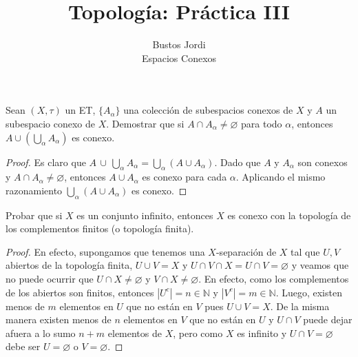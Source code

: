 \documentclass{article}
\theoremstyle{definition}
\newcommand{\N}{\mathbb{N}}
\newenvironment{ejercicio}[1]{\begin{trivlist}
\item[\hskip \labelsep {\bfseries Ejercicio}\hskip \labelsep {\bfseries #1.}]}{\end{trivlist}}
\begin{document}
\title{Topología: Práctica III}
\author{Bustos Jordi\\Espacios Conexos}

\maketitle

\begin{ejercicio}{1}
    Sean \((X, \tau)\) un ET, \( \{ A_\alpha \} \) una colección de subespacios conexos de \(X\) y \(A\) un subespacio conexo de \(X\). Demostrar que si \( A \cap A_\alpha \neq \varnothing \) para todo \( \alpha \), entonces \(A \cup \left( \bigcup_\alpha A_\alpha \right)\) es conexo.
\end{ejercicio}
\begin{proof}
    Es claro que \( A \, \cup \, \bigcup_\alpha A_\alpha = \bigcup_\alpha (A \cup A_\alpha) \).
    Dado que \( A \) y \( A_\alpha \) son conexos y \( A \cap A_\alpha \neq \varnothing \), entonces \( A \cup A_\alpha \) es conexo para cada \( \alpha \). Aplicando el mismo razonamiento \( \bigcup_\alpha (A \cup A_\alpha) \) es conexo.
\end{proof}

\begin{ejercicio}{2}
    Probar que si \( X \) es un conjunto infinito, entonces \(X\) es conexo con la topología de los complementos finitos (o topología finita).
\end{ejercicio}
\begin{proof}
    En efecto, supongamos que tenemos una \( X \)-separación de \( X \) tal que \( U, V \) abiertos de la topología finita, \( U \cup V = X \) y
    \( U \cap V \cap X = U \cap V = \varnothing \) y veamos que no puede ocurrir que \( U \cap X \neq \varnothing \) y \( V \cap X \neq \varnothing \).
    En efecto, como los complementos de los abiertos son finitos, entonces \( |U^c| = n \in \N \) y \( |V^c| = m \in \N \).
    Luego, existen menos de \( m \) elementos en \( U \) que no están en \( V \) pues \( U \cup V = X \).
    De la misma manera existen menos de \( n \) elementos en \( V \) que no están en \( U \) y \( U \cap V \) puede dejar afuera a lo sumo \( n + m \) elementos de \( X \), pero como \( X \) es infinito y \( U \cap V = \varnothing \) debe ser \( U = \varnothing \) o \( V = \varnothing \).
\end{proof}
\end{document}
